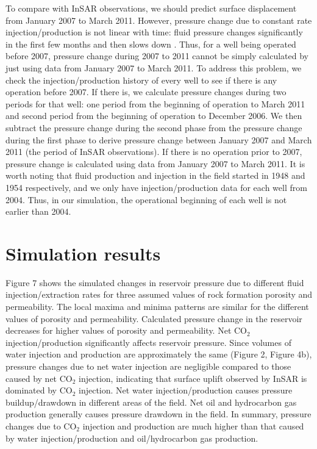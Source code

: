 To compare with InSAR observations, we should predict surface displacement from January 2007 to March 2011.  However, pressure change due to constant rate injection/production is not linear with time: fluid pressure changes significantly in the first few months and then slows down \cite{rohmer2012applicability}.  Thus, for a well being operated before 2007, pressure change during 2007 to 2011 cannot be simply calculated by just using data from January 2007 to March 2011.  To address this problem, we check the injection/production history of every well to see if there is any operation before 2007.  If there is, we calculate pressure changes during two periods for that well: one period from the beginning of operation to March 2011 and second period from the beginning of operation to December 2006. We then subtract the pressure change during the second phase from the pressure change during the first phase to derive pressure change between January 2007 and March 2011 (the period of InSAR observations).   If there is no operation prior to 2007, pressure change is calculated using data from January 2007 to March 2011.  It is worth noting that fluid production and injection in the field started in 1948 and 1954 respectively, and we only have injection/production data for each well from 2004. Thus, in our simulation, the operational beginning of each well is not earlier than 2004.  

\section{Simulation results}
Figure 7 shows the simulated changes in reservoir pressure due to different fluid injection/extraction rates for three assumed values of rock formation porosity and permeability.  The local maxima and minima patterns are similar for the different values of porosity and permeability.  Calculated pressure change in the reservoir decreases for higher values of porosity and permeability.  Net CO$_{2}$ injection/production significantly affects reservoir pressure.  Since volumes of water injection and production are approximately the same (Figure 2, Figure 4b), pressure changes due to net water injection are negligible compared to those caused by net CO$_{2}$ injection, indicating that surface uplift observed by InSAR is dominated by CO$_{2}$ injection. Net water injection/production causes pressure buildup/drawdown in different areas of the field.  Net oil and hydrocarbon gas production generally causes pressure drawdown in the field.  In summary, pressure changes due to CO$_{2}$ injection and production are much higher than that caused by water injection/production and oil/hydrocarbon gas production.

